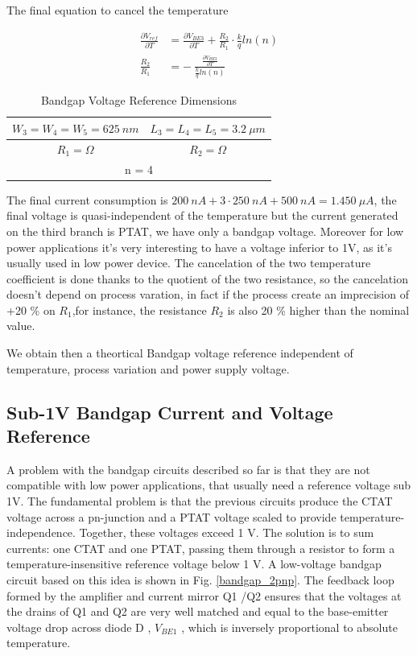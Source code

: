 \documentclass[11pt,a4paper]{report}
\begin{document}
The final equation to cancel the temperature

\begin{align}
  \frac{\partial V_{ref}}{\partial T} & = \frac{\partial V_{BE3}}{\partial T} + \frac{R_2}{R_1} \cdot \frac{k}{q}ln(n) \\
  \frac{R_2}{R_1}                     & = - ~ \frac{ \frac{\partial V_{BE3}}{\partial T} }{ \frac{k}{q}ln(n) }
\end{align}

\begin{table}[h]
  \begin{center}
  \begin{tabular}{|c|c|}\hline
    $W_3 = W_4 = W_5 = 625 ~nm $ & $L_3 = L_4 = L_5 = 3.2~\mu m$ \\ \hline 
    $R_1 =  \Omega$     & $R_2 = \Omega $  \\ \hline \hline
    \multicolumn{2}{|c|}{n = 4} \\ \hline
  \end{tabular}
\end{center}
  \caption{Bandgap Voltage Reference Dimensions}
\end{table}

The final current consumption is $200~nA + 3\cdot250~nA + 500~nA = 1.450~\mu A $, the final voltage is quasi-independent of the temperature but the current generated on the third branch is PTAT, we have only a bandgap voltage. Moreover for low power applications it's very interesting to have a voltage inferior to 1V, as it's usually used in low power device. The cancelation of the two temperature coefficient is done thanks to the quotient of the two resistance, so the cancelation doesn't depend on process varation, in fact if the process create an imprecision of +20 \% on $R_1$,for instance, the resistance $R_2$ is also 20 \% higher than the nominal value.

We obtain then a theortical Bandgap voltage reference independent of temperature, process variation and power supply voltage.

\subsection{ Sub-1V Bandgap Current and Voltage Reference}

A problem with the bandgap circuits described so far is that they are not compatible with low power applications, that  usually need a reference voltage sub 1V. The fundamental problem is that the previous circuits produce the CTAT voltage across a pn-junction and a PTAT voltage scaled to provide temperature- independence. Together, these voltages exceed 1 V. The solution is to sum currents: one CTAT and one PTAT, passing them through a resistor to form a temperature-insensitive reference voltage below 1 V.
A low-voltage bandgap circuit based on this idea is shown in Fig. \ref{bandgap_2pnp}. The feedback loop formed by the amplifier and current mirror Q1 /Q2 ensures that the voltages at the drains of Q1 and Q2 are very well matched and equal to the base-emitter voltage drop across diode D , $V_{BE1}$ , which is inversely proportional to absolute temperature.
 
\end{document}
